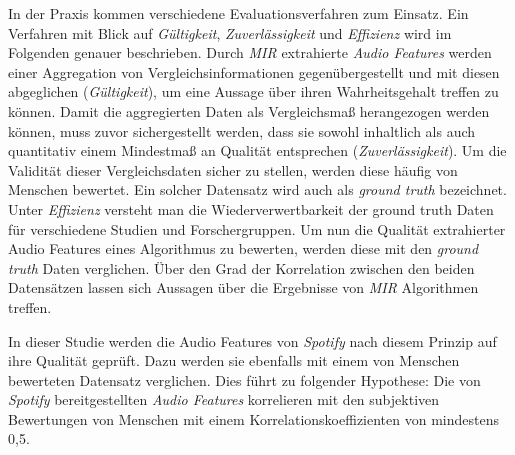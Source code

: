 In der Praxis kommen verschiedene Evaluationsverfahren zum Einsatz.
Ein Verfahren mit Blick auf \textit{Gültigkeit}, \textit{Zuverlässigkeit} und \textit{Effizienz} \cite{Urbano_2013} wird im Folgenden genauer beschrieben.
Durch \textit{MIR} extrahierte \textit{Audio Features} werden einer Aggregation von Vergleichsinformationen gegenübergestellt und mit diesen abgeglichen (\textit{Gültigkeit}), um eine Aussage über ihren Wahrheitsgehalt treffen zu können.
Damit die aggregierten Daten als Vergleichsmaß herangezogen werden können, muss zuvor sichergestellt werden, dass sie sowohl inhaltlich als auch quantitativ einem Mindestmaß an Qualität entsprechen (\textit{Zuverlässigkeit}).
Um die Validität dieser Vergleichsdaten sicher zu stellen, werden diese häufig von Menschen bewertet.
Ein solcher Datensatz wird auch als \textit{ground truth} bezeichnet.
Unter \textit{Effizienz} versteht man die Wiederverwertbarkeit der ground truth Daten für verschiedene Studien und Forschergruppen.
Um nun die Qualität extrahierter Audio Features eines Algorithmus zu bewerten, werden diese mit den \textit{ground truth} Daten verglichen.
Über den Grad der Korrelation zwischen den beiden Datensätzen lassen sich Aussagen über die Ergebnisse von \textit{MIR} Algorithmen treffen.

In dieser Studie werden die Audio Features von \textit{Spotify} nach diesem Prinzip auf ihre Qualität geprüft.
Dazu werden sie ebenfalls mit einem von Menschen bewerteten Datensatz verglichen.
Dies führt zu folgender Hypothese:
Die von \textit{Spotify} bereitgestellten \textit{Audio Features} korrelieren mit den subjektiven Bewertungen von Menschen mit einem Korrelationskoeffizienten von mindestens 0,5.
